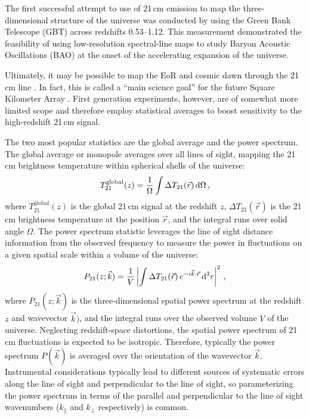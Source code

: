 \begin{bibunit}
The first successful attempt to use of 21\,cm emission to map the three-dimensional structure of the
universe was conducted by \citet{2010Natur.466..463C} using the Green Bank Telescope (GBT) across
redshifts 0.53--1.12. This measurement demonstrated the feasibility of using low-resolution
spectral-line maps to study Baryon Acoustic Oscillations (BAO) at the onset of the accelerating
expansion of the universe.

Ultimately, it may be possible to map the EoR and cosmic dawn through the 21\,cm line
\citep{1997ApJ...475..429M}. In fact, this is called a ``main science goal'' for the future Square
Kilometer Array \citep[SKA;][]{2013ExA....36..235M}.  First generation experiments, however, are of
somewhat more limited scope and therefore employ statistical averages to boost sensitivity to the
high-redshift 21\,cm signal.

The two most popular statistics are the global average and the power spectrum. The global average or
monopole averages over all lines of sight, mapping the 21\,cm brightness temperature within
spherical shells of the universe:
\begin{equation}
    T^\text{global}_{21}(z) = \frac{1}{\Omega}\int \Delta T_{21}(\vec{r}) \, {\textrm d}\Omega \,,
\end{equation}
where $T^\text{global}_{21}(z)$ is the global 21\,cm signal at the redshift $z$, $\Delta
T_{21}(\vec{r})$ is the 21\,cm brightness temperature at the position $\vec{r}$, and the integral
runs over solid angle $\Omega$.  The power spectrum statistic leverages the line of sight distance
information from the observed frequency to measure the power in fluctuations on a given spatial
scale within a volume of the universe:
\begin{equation}
    P_{21}(z; \vec{k}) =
        \frac{1}{V}\left|
        \int \Delta T_{21}(\vec{r}) \, e^{-i\vec{k}\cdot\vec{r}} \, {\textrm d}^3r
        \right|^2\,,
\end{equation}
where $P_{21}(z; \vec{k})$ is the three-dimensional spatial power spectrum at the redshift $z$ and
wavevector $\vec{k})$, and the integral runs over the observed volume $V$ of the universe.
Neglecting redshift-space distortions, the spatial power spectrum of 21\,cm fluctuations is expected
to be isotropic. Therefore, typically the power spectrum $P(\vec{k})$ is averaged over the
orientation of the wavevector $\vec{k}$. Instrumental considerations typically lead to different
sources of systematic errors along the line of sight and perpendicular to the line of sight, so
parameterizing the power spectrum in terms of the parallel and perpendicular to the line of sight
wavenumbers ($k_\parallel$ and $k_\perp$ respectively) is common.


\end{bibunit}
